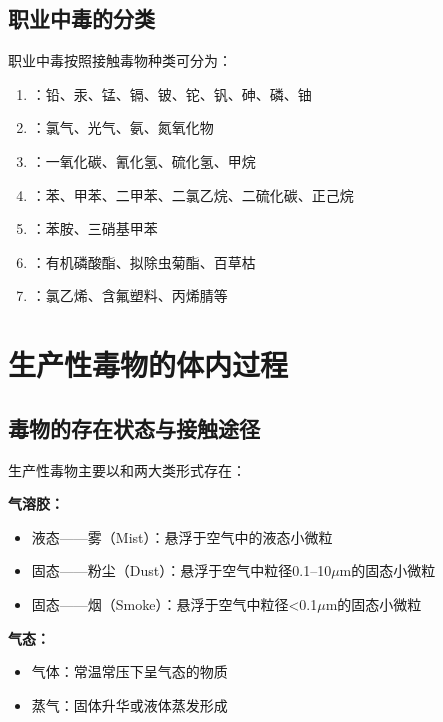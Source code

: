 \subsection{职业中毒的分类}

\begin{keybox}
职业中毒按照接触毒物种类可分为：
\begin{enumerate}[leftmargin=*]
    \item {}：铅、汞、锰、镉、铍、铊、钒、砷、磷、铀
    \item {}：氯气、光气、氨、氮氧化物
    \item {}：一氧化碳、氰化氢、硫化氢、甲烷
    \item {}：苯、甲苯、二甲苯、二氯乙烷、二硫化碳、正己烷
    \item {}：苯胺、三硝基甲苯
    \item {}：有机磷酸酯、拟除虫菊酯、百草枯
    \item {}：氯乙烯、含氟塑料、丙烯腈等
\end{enumerate}
\end{keybox}

\section{生产性毒物的体内过程}

\subsection{毒物的存在状态与接触途径}

\begin{defbox}
生产性毒物主要以和两大类形式存在：

\textbf{气溶胶：}
\begin{itemize}[leftmargin=*]
    \item 液态——雾（Mist）：悬浮于空气中的液态小微粒
    \item 固态——粉尘（Dust）：悬浮于空气中粒径0.1--10$\mu$m的固态小微粒
    \item 固态——烟（Smoke）：悬浮于空气中粒径<0.1$\mu$m的固态小微粒
\end{itemize}

\textbf{气态：}
\begin{itemize}[leftmargin=*]
    \item 气体：常温常压下呈气态的物质
    \item 蒸气：固体升华或液体蒸发形成
\end{itemize}
\end{defbox}

